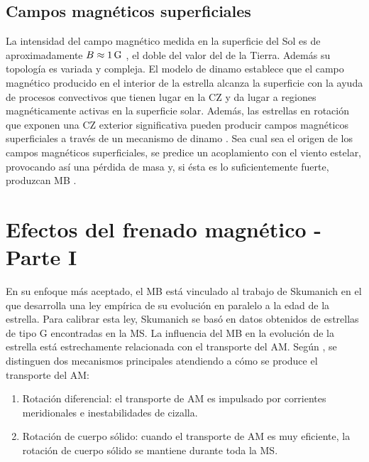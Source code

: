 \subsection{Campos magnéticos superficiales} \label{surf_mf}
La intensidad del campo magnético medida en la superficie del Sol es de aproximadamente $B\approx1\,\mathrm{G}$ \cite{Weber1967,DAntona2000,Morin2012}, el doble del valor del de la Tierra. Además su topología es variada y compleja. El modelo de dinamo establece que el campo magnético producido en el interior de la estrella alcanza la superficie con la ayuda de procesos convectivos que tienen lugar en la CZ y da lugar a regiones magnéticamente activas en la superficie solar. Además, las estrellas en rotación que exponen una CZ exterior significativa pueden producir campos magnéticos superficiales a través de un mecanismo de dinamo \cite[v.g.][]{Brandenburg2004,Charbonneau2010,Brun2017}. Sea cual sea el origen de los campos magnéticos superficiales, se predice un acoplamiento con el viento estelar, provocando así una pérdida de masa y, si ésta es lo suficientemente fuerte, produzcan MB \cite[v.g.][]{UdDoula2002,Ud-Doula2007,Ud-Doula2008,Meynet2010}.\par


\section{Efectos del frenado magnético - Parte I}
En su enfoque más aceptado, el MB está vinculado al trabajo de Skumanich \cite{Skumanich1972} en el que desarrolla una ley empírica de su evolución en paralelo a la edad de la estrella. Para calibrar esta ley, Skumanich se basó en datos obtenidos de estrellas de tipo G encontradas en la MS. La influencia del MB en la evolución de la estrella está estrechamente relacionada con el transporte del AM. Según \cite{Meynet2010}, se distinguen dos mecanismos principales atendiendo a cómo se produce el transporte del AM:

\begin{enumerate}
    \item Rotación diferencial: el transporte de AM es impulsado por corrientes meridionales e inestabilidades de cizalla.
    \item Rotación de cuerpo sólido: cuando el transporte de AM es muy eficiente, la rotación de cuerpo sólido se mantiene durante toda la MS.
\end{enumerate}

